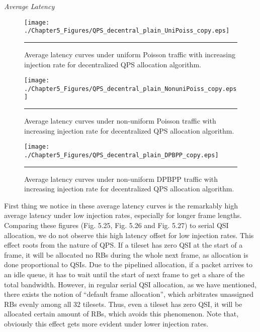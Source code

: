 \textit{Average Latency}


\begin{figure}[htbp]
  \centering
    \texttt{[image: ./Chapter5\_Figures/QPS\_decentral\_plain\_UniPoiss\_copy.eps]}
    \rule{35em}{0.5pt}
  \caption[Decentralized QPS Allocation Average latency under uniform Poisson]{Average latency curves under uniform Poisson traffic with increasing injection rate for decentralized QPS allocation algorithm.}
  \label{fig:Electron}
\end{figure}

\begin{figure}[htbp]
  \centering
    \texttt{[image: ./Chapter5\_Figures/QPS\_decentral\_plain\_NonuniPoiss\_copy.eps]}
    \rule{35em}{0.5pt}
  \caption[Decentralized QPS Allocation Average latency under non-uniform Poisson]{Average latency curves under non-uniform Poisson traffic with increasing injection rate for decentralized QPS allocation algorithm.}
  \label{fig:Electron}
\end{figure}


\begin{figure}[htbp]
  \centering
    \texttt{[image: ./Chapter5\_Figures/QPS\_decentral\_plain\_DPBPP\_copy.eps]}
    \rule{35em}{0.5pt}
  \caption[Decentralized QPS Allocation Average latency under non-uniform DPBPP]{Average latency curves under non-uniform DPBPP traffic with increasing injection rate for decentralized QPS allocation algorithm.}
  \label{fig:Electron}
\end{figure}
 

First thing we notice in these average latency curves is the remarkably high average latency under low injection rates, especially for longer frame lengths. Comparing these figures (Fig. 5.25, Fig. 5.26 and Fig. 5.27) to serial QSI allocation, we do not observe this high latency offset for low injection rates. This effect roots from the nature of QPS. If a tileset has zero QSI at the start of a frame, it will be allocated no RBs during the whole next frame, as allocation is done proportional to QSIs. Due to the pipelined allocation, if a packet arrives to an idle queue, it has to wait until the start of next frame to get a share of the total bandwidth. However, in regular serial QSI allocation, as we have mentioned, there exists the notion of \textquotedblleft default frame allocation\textquotedblright, which arbitrates unassigned RBs evenly among all 32 tilesets. Thus, even a tileset has zero QSI, it will be allocated certain amount of RBs, which avoids this phenomenon. Note that, obviously this effect gets more evident under lower injection rates.


